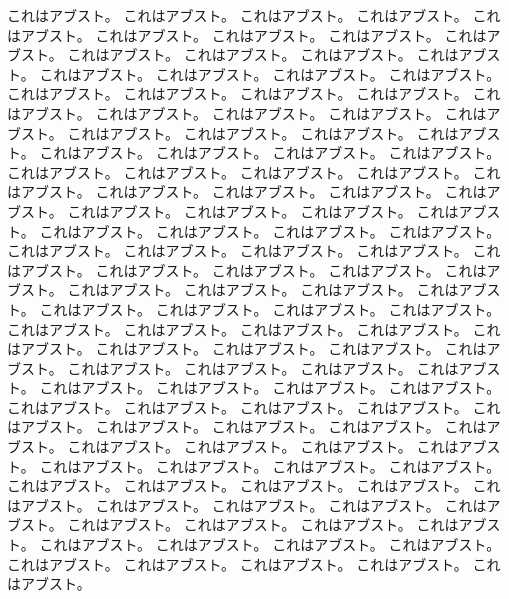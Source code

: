 これはアブスト。
これはアブスト。
これはアブスト。
これはアブスト。
これはアブスト。
これはアブスト。
これはアブスト。
これはアブスト。
これはアブスト。
これはアブスト。
これはアブスト。
これはアブスト。
これはアブスト。
これはアブスト。
これはアブスト。
これはアブスト。
これはアブスト。
これはアブスト。
これはアブスト。
これはアブスト。
これはアブスト。
これはアブスト。
これはアブスト。
これはアブスト。
これはアブスト。
これはアブスト。
これはアブスト。
これはアブスト。
これはアブスト。
これはアブスト。
これはアブスト。
これはアブスト。
これはアブスト。
これはアブスト。
これはアブスト。
これはアブスト。
これはアブスト。
これはアブスト。
これはアブスト。
これはアブスト。
これはアブスト。
これはアブスト。
これはアブスト。
これはアブスト。
これはアブスト。
これはアブスト。
これはアブスト。
これはアブスト。
これはアブスト。
これはアブスト。
これはアブスト。
これはアブスト。
これはアブスト。
これはアブスト。
これはアブスト。
これはアブスト。
これはアブスト。
これはアブスト。
これはアブスト。
これはアブスト。
これはアブスト。
これはアブスト。
これはアブスト。
これはアブスト。
これはアブスト。
これはアブスト。
これはアブスト。
これはアブスト。
これはアブスト。
これはアブスト。
これはアブスト。
これはアブスト。
これはアブスト。
これはアブスト。
これはアブスト。
これはアブスト。
これはアブスト。
これはアブスト。
これはアブスト。
これはアブスト。
これはアブスト。
これはアブスト。
これはアブスト。
これはアブスト。
これはアブスト。
これはアブスト。
これはアブスト。
これはアブスト。
これはアブスト。
これはアブスト。
これはアブスト。
これはアブスト。
これはアブスト。
これはアブスト。
これはアブスト。
これはアブスト。
これはアブスト。
これはアブスト。
これはアブスト。
これはアブスト。
これはアブスト。
これはアブスト。
これはアブスト。
これはアブスト。
これはアブスト。
これはアブスト。
これはアブスト。
これはアブスト。
これはアブスト。
これはアブスト。
これはアブスト。
これはアブスト。
これはアブスト。
これはアブスト。
これはアブスト。
これはアブスト。
これはアブスト。
これはアブスト。
これはアブスト。
これはアブスト。
これはアブスト。
これはアブスト。
これはアブスト。
これはアブスト。
